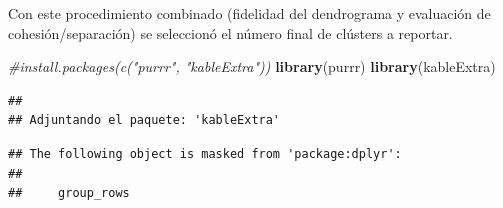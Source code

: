 \documentclass[
]{book}
\newenvironment{Shaded}{\begin{snugshade}}{\end{snugshade}}
\newcommand{\CommentTok}[1]{\textcolor[rgb]{0.56,0.35,0.01}{\textit{#1}}}
\newcommand{\FunctionTok}[1]{\textcolor[rgb]{0.13,0.29,0.53}{\textbf{#1}}}
\newcommand{\NormalTok}[1]{#1}
\begin{document}
Con este procedimiento combinado (fidelidad del dendrograma y evaluación de cohesión/separación) se seleccionó el número final de clústers a reportar.

\begin{Shaded}
\begin{Highlighting}[]
\CommentTok{\#install.packages(c("purrr", "kableExtra"))}
\FunctionTok{library}\NormalTok{(purrr)}
\FunctionTok{library}\NormalTok{(kableExtra)}
\end{Highlighting}
\end{Shaded}

\begin{verbatim}
## 
## Adjuntando el paquete: 'kableExtra'
\end{verbatim}

\begin{verbatim}
## The following object is masked from 'package:dplyr':
## 
##     group_rows
\end{verbatim}
\end{document}
